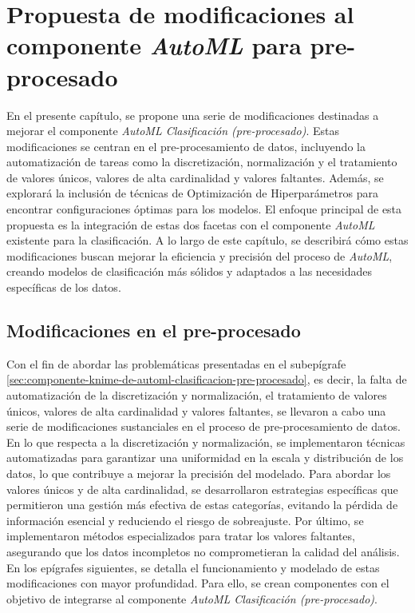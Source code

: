 \chapter{Propuesta de modificaciones al componente \textit{AutoML} para pre-procesado}\label{chap:2}
En el presente capítulo, se propone una serie de modificaciones destinadas a mejorar el componente \emph{AutoML Clasificación (pre-procesado)}. Estas modificaciones se centran en el pre-procesamiento de datos, incluyendo la automatización de tareas como la discretización, normalización y el tratamiento de valores únicos, valores de alta cardinalidad y valores faltantes. Además, se explorará la inclusión de técnicas de Optimización de Hiperparámetros para encontrar configuraciones óptimas para los modelos. El enfoque principal de esta propuesta es la integración de estas dos facetas con el componente \textit{AutoML} existente para la clasificación. A lo largo de este capítulo, se describirá cómo estas modificaciones buscan mejorar la eficiencia y precisión del proceso de \textit{AutoML}, creando modelos de clasificación más sólidos y adaptados a las necesidades específicas de los datos.

\section{Modificaciones en el pre-procesado}
Con el fin de abordar las problemáticas presentadas en el subepígrafe \ref{sec:componente-knime-de-automl-clasificacion-pre-procesado}, es decir, la falta de automatización de la discretización y normalización, el tratamiento de valores únicos, valores de alta cardinalidad y valores faltantes, se llevaron a cabo una serie de modificaciones sustanciales en el proceso de pre-procesamiento de datos. \\
 En lo que respecta a la discretización y normalización, se implementaron técnicas automatizadas para garantizar una uniformidad en la escala y distribución de los datos, lo que contribuye a mejorar la precisión del modelado. Para abordar los valores únicos y de alta cardinalidad, se desarrollaron estrategias específicas que permitieron una gestión más efectiva de estas categorías, evitando la pérdida de información esencial y reduciendo el riesgo de sobreajuste. Por último, se implementaron métodos especializados para tratar los valores faltantes, asegurando que los datos incompletos no comprometieran la calidad del análisis. En los epígrafes siguientes, se detalla el funcionamiento y modelado de estas modificaciones con mayor profundidad. Para ello, se crean componentes con el objetivo de integrarse al componente\textit{ AutoML Clasificación (pre-procesado)}.

